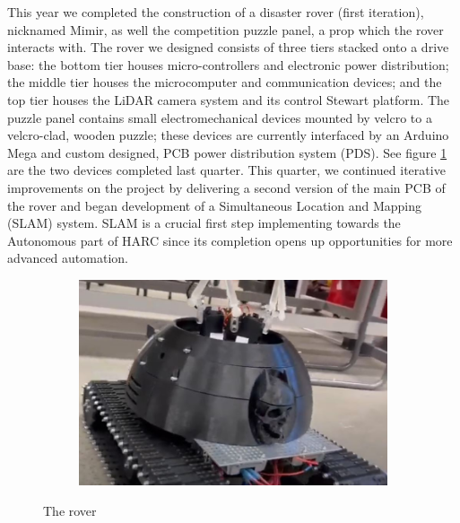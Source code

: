 \documentclass[a4paper, 10pt]{article}
\begin{document}
	This year we completed the construction of a disaster rover (first iteration), nicknamed Mimir, as well the competition puzzle panel, a prop which the rover interacts with. The rover we designed consists of three tiers stacked onto a drive base: the bottom tier houses micro-controllers and electronic power distribution; the middle tier houses the microcomputer and communication devices; and the top tier houses the LiDAR camera system and its control Stewart platform. The puzzle panel contains small electromechanical devices mounted by velcro to a velcro-clad, wooden puzzle; these devices are currently interfaced by an Arduino Mega and custom designed, PCB power distribution system (PDS). See figure \ref{executive_summary_pictures} are the two devices completed last quarter. This quarter, we continued iterative improvements on the project by delivering a second version of the main PCB of the rover and began development of a Simultaneous Location and Mapping (SLAM) system. SLAM is a crucial first step implementing towards the Autonomous part of HARC since its completion opens up opportunities for more advanced automation.
	
		\begin{figure}[h]
			\begin{subfigure}[h]{0.55\textwidth}
				\centering
				\includegraphics[width=\textwidth]{Photos/rover_front}
			\end{subfigure}
			\centering
			\caption{The rover}
			\label{executive_summary_pictures}
		\end{figure}
	
\pagebreak
\end{document}
